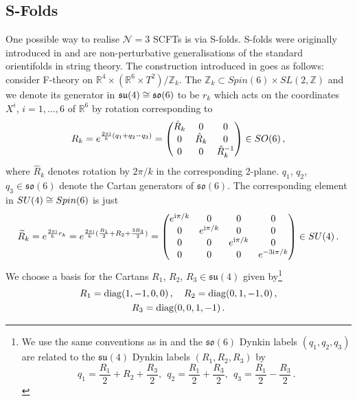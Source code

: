 \documentclass[main.tex]{subfiles}
\begin{document}
\subsection{S-Folds}\label{sec:sfold}
One possible way to realise $\mathcal{N}=3$ SCFTs is via S-folds. S-folds were originally introduced in \cite{Garcia-Etxebarria:2015wns} and are non-perturbative generalisations of the standard orientifolds in string theory. The construction introduced in \cite{Garcia-Etxebarria:2015wns} goes as follows: consider F-theory on $\mathbb{R}^4\times\left(\mathbb{R}^6\times T^2\right)/\mathbb{Z}_k$. The $\mathbb{Z}_k\subset Spin(6)\times SL(2,\mathbb{Z})$ and we denote its generator in $\mathfrak{su}(4)\cong\mathfrak{so}(6)$ to be $r_k$ which acts on the coordinates $X^i$, $i=1,\dots,6$ of $\mathbb{R}^6$ by rotation corresponding to
\begin{equation}
R_k=e^{\frac{2\pi\mathrm{i}}{k} (q_1+q_2-q_3)}=\begin{pmatrix}
\hat{R}_k&0&0\\
0&\hat{R}_k&0\\
0&0&\hat{R}_k^{-1}
\end{pmatrix}\in SO(6)\,,
\end{equation}
where $\hat{R}_k$ denotes rotation by $2\pi/k$ in the corresponding 2-plane. $q_1$, $q_2$, $q_3\in\mathfrak{so}(6)$ denote the Cartan generators of $\mathfrak{so}(6)$. The corresponding element in $SU(4)\cong Spin(6)$ is just
\begin{equation}\label{eqn:Rsym}
\widetilde{R}_k=e^{\frac{2\pi\mathrm{i}}{k}r_k}=e^{\frac{2\pi\mathrm{i}}{k} (\frac{R_1}{2}+R_2+\frac{3R_3}{2})}=\begin{pmatrix}
e^{\mathrm{i}\pi/k}&0&0&0\\
0&e^{\mathrm{i}\pi/k}&0&0\\
0&0&e^{\mathrm{i}\pi/k}&0\\
0&0&0&e^{-3\mathrm{i}\pi/k}
\end{pmatrix}\in SU(4)\,.
\end{equation}
We choose a basis for the Cartans $R_1$, $R_2$, $R_3\in\mathfrak{su}(4)$ given by\footnote{We use the same conventions as in \cite{Kinney:2005ej} and the $\mathfrak{so}(6)$ Dynkin labels $(q_1,q_2,q_3)$ are related to the $\mathfrak{su}(4)$ Dynkin labels $(R_1,R_2,R_3)$ by
\begin{equation*}
q_1=\frac{R_1}{2}+R_2+\frac{R_3}{2}, \ \ q_2=\frac{R_1}{2}+\frac{R_3}{2}, \ \ q_3=\frac{R_1}{2}-\frac{R_3}{2}\,.
\end{equation*}
} 
\begin{gather}
R_1=\operatorname{diag}(1,-1,0,0)\,,\quad R_2=\operatorname{diag}(0,1,-1,0)\,,\\ R_3=\operatorname{diag}(0,0,1,-1)\,.
\end{gather}
\end{document}
